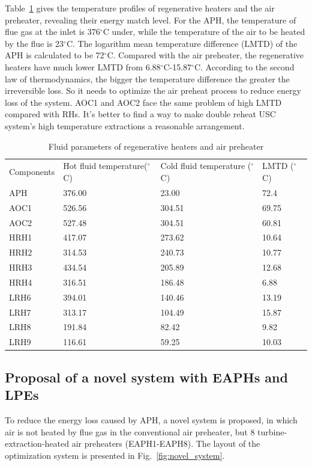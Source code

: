 \documentclass[preprint,12pt]{elsarticle}
\begin{document}
Table~\ref{tab:reheater parameter} gives the temperature profiles of regenerative heaters and the air preheater, revealing their energy match level.
For the APH, the temperature of flue gas at the inlet is 376$^\circ$C under, while the temperature of the air to be heated by the flue is 23$^\circ$C.
The logarithm mean temperature difference (LMTD) of the APH is calculated to be 72$^\circ$C.
Compared with the air preheater, the regenerative heaters have much lower LMTD from 6.88$^\circ$C-15.87$^\circ$C.
According to the second law of thermodynamics, the bigger the temperature difference the greater the irreversible loss.
So it needs to optimize the air preheat process to reduce energy loss of the system.
AOC1 and AOC2 face the same problem of high LMTD compared with RHs.
It's better to find a way to make double reheat USC system's high temperature extractions a reasonable arrangement.



\begin{table}[htbp]
\caption{Fluid parameters of regenerative heaters and air preheater}
\label{tab:reheater parameter}
\centering
\begin{tabular}{llll}
\toprule 
\multirow{2}{2cm}{Components} &\multirow{2}{2.7cm}{Hot fluid temperature($^\circ$C)}  & \multirow{2}{3.2cm}{Cold fluid temperature ($^\circ$C)}&\multirow{2}{2.2cm}{LMTD ($^\circ$C)}\tabularnewline
&&&\tabularnewline
\midrule
APH  &  376.00 	& 23.00  & 72.4\tabularnewline
AOC1 &   526.56 & 304.51 & 69.75\tabularnewline
AOC2 &  527.48 	& 304.51 & 60.81\tabularnewline
HRH1 &   417.07 & 273.62 & 10.64\tabularnewline
HRH2 &   314.53 & 240.73 & 10.77\tabularnewline
HRH3 &   434.54 & 205.89 & 12.68\tabularnewline
HRH4 &   316.51 & 186.48 & 6.88\tabularnewline
LRH6 &  394.01 	& 140.46 & 13.19\tabularnewline
LRH7 &   313.17 & 104.49 & 15.87\tabularnewline
LRH8 &   191.84 & 82.42  & 9.82\tabularnewline
LRH9 &   116.61 & 59.25  & 10.03\tabularnewline
\bottomrule
\end{tabular}
\end{table}




\subsection{Proposal of a novel system with EAPHs and LPEs}
\label{sub2:prop novel sys}

To reduce the energy loss caused by APH, a novel system is proposed, in which air is not heated by flue gas in the conventional air preheater, but 8 turbine-extraction-heated air preheaters (EAPH1-EAPH8).
The layout of the optimization system is presented in Fig.~\ref{fig:novel_system}.
\end{document}

